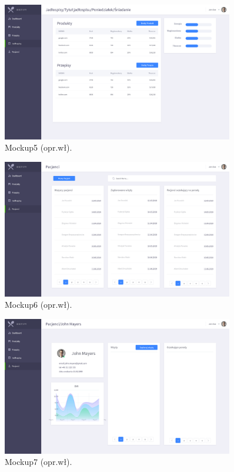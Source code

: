 \begin{minipage}{\textwidth}
    \begin{figure}[H]
        \centering\includegraphics[width=0.9\textwidth]{img/mockups/mockup5.png}
        \caption{Mockup5 (opr.wł).}\label{rysunek:mockup5}
    \end{figure}
\end{minipage}

\begin{minipage}{\textwidth}
    \begin{figure}[H]
        \centering\includegraphics[width=0.9\textwidth]{img/mockups/mockup6.png}
        \caption{Mockup6 (opr.wł).}\label{rysunek:mockup6}
    \end{figure}
\end{minipage}

\begin{minipage}{\textwidth}
    \begin{figure}[H]
        \centering\includegraphics[width=0.9\textwidth]{img/mockups/mockup7.png}
        \caption{Mockup7 (opr.wł).}\label{rysunek:mockup7}
    \end{figure}
\end{minipage}

